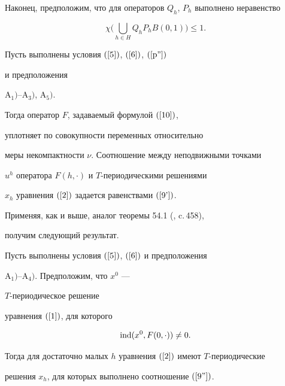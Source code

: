 Наконец, предположим, что для операторов $Q_h$, $P_h$ выполнено неравенство


\begin{equation}\label{p''}


\chi \Big(\bigcup_{h\in H}Q_hP_hB(0,1)\Big)\le 1.


\end{equation}





\begin{thm}\label{th3}


Пусть выполнены условия $(\ref{5})$, $(\ref{6})$, $(\ref{p''})$


и предположения


$\mathrm A_1)$--$\mathrm A_3)$, $\mathrm A_5)$.


Тогда оператор $F$, задаваемый формулой $(\ref{10})$,


уплотняет по совокупности переменных относительно


меры некомпактности $\nu$. Соотношение между неподвижными точками


$u^h$ оператора $F(h,\cdot)$ и $T$-периодическими решениями 


$x_h$ уравнения $(\ref{2})$ задается равенствами $(\ref{9'})$.


\end{thm}





Применяя, как и выше, аналог теоремы 54.1 (\cite{2}, c.\,458), 


получим следующий результат.





\begin{thm} Пусть выполнены условия $(\ref{5})$, $(\ref{6})$ и предположения


$\mathrm A_1)$--$\mathrm A_4)$. Предположим, что $x^0$ ---


$T$-периодическое решение


уравнения $(\ref{1})$, для которого 


\begin{equation}\label{11}


\ind (x^0, F(0,\cdot))\ne 0.


\end{equation} 


Тогда для достаточно малых $h$ уравнения $(\ref{2})$ имеют $T$-периодические


решения $x_h$, для которых выполнено соотношение $(\ref{9''})$.


\end{thm} 





